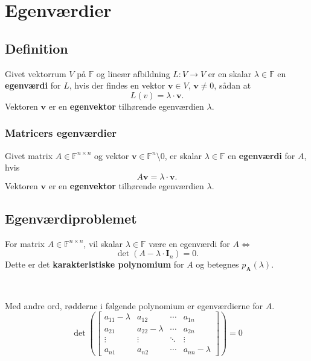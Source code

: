 \section{Egenværdier}
\subsection{Definition}
Givet vektorrum $V$ på $\mathbb{F}$ og lineær afbildning $L: V \to V$ 
er en skalar $\lambda \in \mathbb{F}$ en \textbf{egenværdi} for $L$, hvis der findes en vektor $\mathbf{v} \in V$, $\mathbf{v} \neq 0$, sådan at
\[L(v) = \lambda \cdot \mathbf{v}.\]
Vektoren $\mathbf{v}$ er en \textbf{egenvektor} tilhørende egenværdien $\lambda$.


\subsubsection{Matricers egenværdier}
Givet matrix $A \in \mathbb{F}^{n \times n}$ og vektor $\mathbf{v} \in \mathbb{F}^n \setminus 0$, er skalar $\lambda \in \mathbb{F}$ en \textbf{egenværdi} for $A$, hvis
\[A \mathbf{v} = \lambda \cdot \mathbf{v}.\]
Vektoren $\mathbf{v}$ er en \textbf{egenvektor} tilhørende egenværdien $\lambda$.


\subsection{Egenværdiproblemet}
For matrix $A \in \mathbb{F}^{n \times n}$, vil skalar $\lambda \in \mathbb{F}$ være en egenværdi for $A \iff$
\[\det(A - \lambda \cdot \mathbf{I}_n) = 0.\]
Dette er det \textbf{karakteristiske polynomium} for $A$ og betegnes $p_{\mathbf{A}}(\lambda)$.

\

Med andre ord, rødderne i følgende polynomium er egenværdierne for $A$.
\[
\det \left(
    \begin{bmatrix}
        a_{11} - \lambda & a_{12} & \cdots & a_{1n} \\
        a_{21} & a_{22} - \lambda & \cdots & a_{2n} \\
        \vdots & \vdots & \ddots & \vdots \\
        a_{n1} & a_{n2} & \cdots & a_{nn} - \lambda 
    \end{bmatrix}\right) = 0
\]

